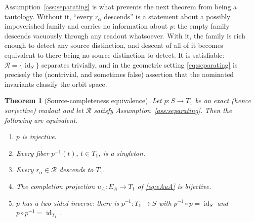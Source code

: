 \documentclass[11pt,reqno]{amsart}
\theoremstyle{plain}
\newtheorem{theorem}{Theorem}[section]
\theoremstyle{definition}
\theoremstyle{remark}
\DeclareMathOperator{\id}{id}
\begin{document}
Assumption~\ref{ass:separating} is what prevents the next theorem from being a tautology. Without it, ``every $r_\alpha$ descends'' is a statement about a possibly impoverished family and carries no information about $p$: the empty family descends vacuously through any readout whatsoever. With it, the family is rich enough to detect any source distinction, and descent of all of it becomes equivalent to there being no source distinction to detect. It is satisfiable: $\mathcal R=\{\id_S\}$ separates trivially, and in the geometric setting \eqref{eq:separating} is precisely the (nontrivial, and sometimes false) assertion that the nominated invariants classify the orbit space.

\begin{theorem}[Source-completeness equivalence]\label{thm:completeness}
Let $p\colon S\to T_1$ be an exact (hence surjective) readout and let $\mathcal R$ satisfy Assumption~\ref{ass:separating}. Then the following are equivalent.
\begin{enumerate}
\item[(C1)] $p$ is injective.
\item[(C2)] Every fiber $p^{-1}(t)$, $t\in T_1$, is a singleton.
\item[(C3)] Every $r_\alpha\in\mathcal R$ descends to $T_1$.
\item[(C4)] The completion projection $u_A\colon E_A\to T_1$ of \eqref{eq:eAuA} is bijective.
\item[(C5)] $p$ has a two-sided inverse: there is $p^{-1}\colon T_1\to S$ with $p^{-1}\circ p=\id_S$ and $p\circ p^{-1}=\id_{T_1}$.
\end{enumerate}
\end{theorem}
\end{document}
